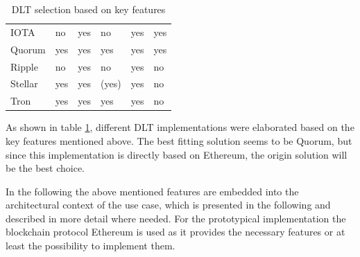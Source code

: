 \documentclass[conference]{IEEEtran}
\begin{document}
\begin{table}[h]
\begin{tabular}{@{}llllll@{}}
IOTA                          & no                                                                                     & yes                                  & no                                                                                     & yes                                 & yes                                   \\
Quorum                        & yes                                                                                    & yes                                  & yes                                                                                    & yes                                 & yes                                   \\
Ripple                        & no                                                                                     & yes                                  & no                                                                                     & yes                                 & no                                    \\
Stellar                       & yes                                                                                    & yes                                  & (yes)                                                                                  & yes                                 & no                                    \\
Tron                          & yes                                                                                    & yes                                  & yes                                                                                    & yes                                 & no                                    \\ \bottomrule
\end{tabular}
\caption{DLT selection based on key features}
\label{tab:selection}
\end{table}

As shown in table \ref{tab:selection}, different DLT implementations were elaborated based on the key features mentioned above. The best fitting solution seems to be Quorum, but since this implementation is directly based on Ethereum, the origin solution will be the best choice.

In the following the above mentioned features are embedded into the architectural context of the use case, which is presented in the following and described in more detail where needed. For the prototypical implementation the blockchain protocol Ethereum \cite{buterin2013} is used as it provides the necessary features or at least the possibility to implement them.
\end{document}
